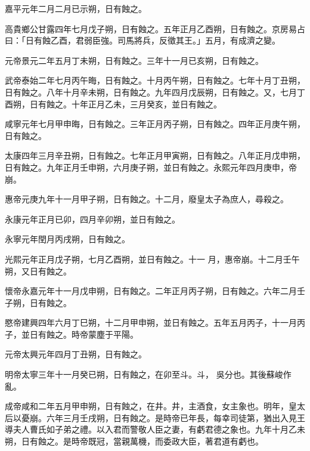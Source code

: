 \begin{pinyinscope}
 嘉平元年二月二月已示朔，日有蝕之。



 高貴鄉公甘露四年七月戊子朔，日有蝕之。五年正月乙酉朔，日有蝕之。京房易占曰：「日有蝕乙酉，君弱臣強。司馬將兵，反徵其王。」五月，有成濟之變。



 元帝景元二年五月丁未朔，日有蝕之。三年十一月已亥朔，日有蝕之。



 武帝泰始二年七月丙午晦，日有蝕之。十月丙午朔，日有蝕之。七年十月丁丑朔，日有蝕之。八年十月辛未朔，日有蝕之。九年四月戊辰朔，日有蝕之。又，七月丁酉朔，日有蝕之。十年正月乙未，三月癸亥，並日有蝕之。



 咸寧元年七月甲申晦，日有蝕之。三年正月丙子朔，日有蝕之。四年正月庚午朔，日有蝕之。



 太康四年三月辛丑朔，日有蝕之。七年正月甲寅朔，日有蝕之。八年正月戊申朔，日有蝕之。九年正月壬申朔，六月庚子朔，並日有蝕之。永熙元年四月庚申，帝崩。



 惠帝元庚九年十一月甲子朔，日有蝕之。十二月，廢皇太子為庶人，尋殺之。



 永康元年正月已卯，四月辛卯朔，並日有蝕之。



 永寧元年閏月丙戌朔，日有蝕之。



 光熙元年正月戊子朔，七月乙酉朔，並日有蝕之。十一
 月，惠帝崩。十二月壬午朔，又日有蝕之。



 懷帝永嘉元年十一月戊申朔，日有蝕之。二年正月丙子朔，日有蝕之。六年二月壬子朔，日有蝕之。



 愍帝建興四年六月丁巳朔，十二月甲申朔，並日有蝕之。五年五月丙子，十一月丙子，並日有蝕之。時帝蒙塵于平陽。



 元帝太興元年四月丁丑朔，日有蝕之。



 明帝太寧三年十一月癸已朔，日有蝕之，在卯至斗。斗，
 吳分也。其後蘇峻作亂。



 成帝咸和二年五月甲申朔，日有蝕之，在井。井，主酒食，女主象也。明年，皇太后以憂崩。六年三月壬戌朔，日有蝕之。是時帝已年長，每幸司徒第，猶出入見王導夫人曹氏如子弟之禮。以入君而警敬人臣之妻，有虧君德之象也。九年十月乙未朔，日有蝕之。是時帝既冠，當親萬機，而委政大臣，著君道有虧也。




\end{pinyinscope}

